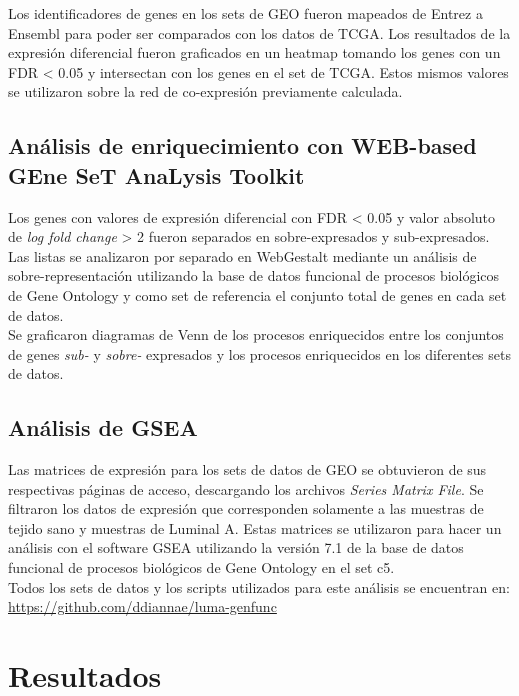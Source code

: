 \documentclass{article}
\begin{document}
Los identificadores de  genes en los sets de GEO fueron mapeados de Entrez a Ensembl para poder ser comparados con los datos de TCGA. Los resultados de la expresión diferencial fueron graficados en un heatmap tomando los genes con un FDR < 0.05 y intersectan con los genes en el set de TCGA. Estos mismos valores se utilizaron sobre la red de co-expresión previamente calculada. 

\subsection*{Análisis de enriquecimiento con WEB-based GEne SeT AnaLysis Toolkit}
Los genes con valores de expresión diferencial con FDR < 0.05 y valor absoluto de \textit{log fold change} > 2 fueron separados en sobre-expresados y sub-expresados. Las listas se analizaron por separado en WebGestalt mediante un análisis de sobre-representación utilizando la base de datos funcional de procesos biológicos de Gene Ontology y como set de referencia el conjunto total de genes en cada set de datos.\\
Se graficaron diagramas de Venn de los procesos enriquecidos entre los conjuntos de genes \textit{sub-} y \textit{sobre-} expresados y los procesos enriquecidos en los diferentes sets de datos.

\subsection*{Análisis de GSEA}
Las matrices de expresión para los sets de datos de GEO se obtuvieron de sus respectivas páginas de acceso, descargando los archivos \textit{Series Matrix File}. Se filtraron los datos de expresión que corresponden solamente a las muestras de tejido sano y muestras de Luminal A. Estas matrices se utilizaron para hacer un análisis con el software GSEA utilizando la versión 7.1 de la base de datos funcional de procesos biológicos de Gene Ontology en el set c5.\\

Todos los sets de datos y los scripts utilizados para este análisis se encuentran en:  \\
\url{https://github.com/ddiannae/luma-genfunc}

\section*{Resultados}
\end{document}
